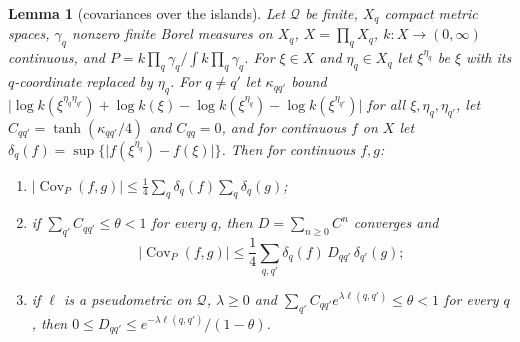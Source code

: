 \documentclass[11pt]{amsart}
\newtheorem{lemma}[theorem]{Lemma}
\theoremstyle{definition}
\theoremstyle{remark}
\numberwithin{equation}{section}
\newcommand{\Cov}{\operatorname{Cov}}
\begin{document}
\begin{lemma}[covariances over the islands]\label{lem:islandcov}
Let $\mathcal Q$ be finite, $X_q$ compact metric spaces, $\gamma_q$ nonzero
finite Borel measures on $X_q$, $X=\prod_qX_q$, $k:X\to(0,\infty)$
continuous, and $P=k\prod_q\gamma_q/\int k\prod_q\gamma_q$. For $\xi\in X$
and $\eta_q\in X_q$ let $\xi^{\eta_q}$ be $\xi$ with its $q$-coordinate
replaced by $\eta_q$. For $q\ne q'$ let $\kappa_{qq'}$ bound
$\lvert\log k(\xi^{\eta_q\eta_{q'}})+\log k(\xi)-\log k(\xi^{\eta_q})-\log
k(\xi^{\eta_{q'}})\rvert$ for all $\xi,\eta_q,\eta_{q'}$, let $C_{qq'}=
\tanh(\kappa_{qq'}/4)$ and $C_{qq}=0$, and for continuous $f$ on $X$ let
$\delta_q(f)=\sup\{\lvert f(\xi^{\eta_q})-f(\xi)\rvert\}$. Then for
continuous $f,g$:
\begin{enumerate}[label=\textup{(\roman*)},leftmargin=*]
\item $\lvert\Cov_P(f,g)\rvert\le\frac14\sum_q\delta_q(f)\sum_q\delta_q(g)$;
\item if $\sum_{q'}C_{qq'}\le\theta<1$ for every $q$, then $D=\sum_{n\ge0}
C^n$ converges and
\[
\lvert\Cov_P(f,g)\rvert\le\frac14\sum_{q,q'}\delta_q(f)\,D_{qq'}\,
\delta_{q'}(g);
\]
\item if $\ell$ is a pseudometric on $\mathcal Q$, $\lambda\ge0$ and
$\sum_{q'}C_{qq'}e^{\lambda\ell(q,q')}\le\theta<1$ for every $q$, then
$0\le D_{qq'}\le e^{-\lambda\ell(q,q')}/(1-\theta)$.
\end{enumerate}
\end{lemma}
\end{document}
